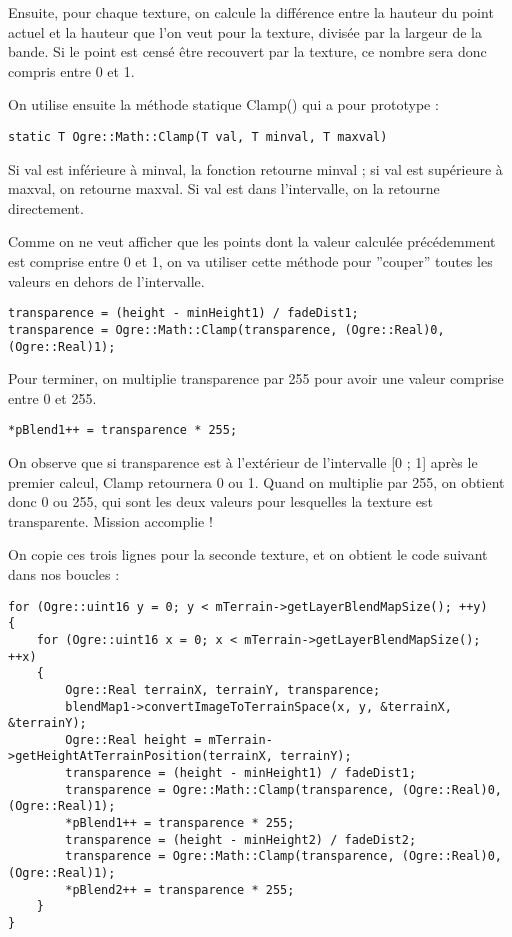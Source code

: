 \documentclass[10pt,a4paper]{report}
\begin{document}
Ensuite, pour chaque texture, on calcule la diff\'erence entre la hauteur du point actuel et la hauteur que l'on veut pour la texture, divis\'ee par la largeur de la bande. Si le point est cens\'e \^etre recouvert par la texture, ce nombre sera donc compris entre 0 et 1.

On utilise ensuite la m\'ethode statique Clamp() qui a pour prototype :

\begin{lstlisting}[caption={Utilisation de la m\'ethode statique Clamp()}]
static T Ogre::Math::Clamp(T val, T minval, T maxval)
\end{lstlisting}

Si val est inf\'erieure \`a minval, la fonction retourne minval ; si val est sup\'erieure \`a maxval, on retourne maxval. Si val est dans l'intervalle, on la retourne directement.

Comme on ne veut afficher que les points dont la valeur calcul\'ee pr\'ec\'edemment est comprise entre 0 et 1, on va utiliser cette m\'ethode pour ''couper'' toutes les valeurs en dehors de l'intervalle.

\begin{lstlisting}[caption={}]
transparence = (height - minHeight1) / fadeDist1;
transparence = Ogre::Math::Clamp(transparence, (Ogre::Real)0, (Ogre::Real)1);
\end{lstlisting}

Pour terminer, on multiplie transparence par 255 pour avoir une valeur comprise entre 0 et 255.

\begin{lstlisting}[caption={}]
*pBlend1++ = transparence * 255;
\end{lstlisting}

On observe que si transparence est \`a l'ext\'erieur de l'intervalle [0 ; 1] apr\`es le premier calcul, Clamp retournera 0 ou 1. Quand on multiplie par 255, on obtient donc 0 ou 255, qui sont les deux valeurs pour lesquelles la texture est transparente. Mission accomplie !

On copie ces trois lignes pour la seconde texture, et on obtient le code suivant dans nos boucles :

\begin{lstlisting}[caption={}]
for (Ogre::uint16 y = 0; y < mTerrain->getLayerBlendMapSize(); ++y)
{
    for (Ogre::uint16 x = 0; x < mTerrain->getLayerBlendMapSize(); ++x)
    {
        Ogre::Real terrainX, terrainY, transparence;
        blendMap1->convertImageToTerrainSpace(x, y, &terrainX, &terrainY);
        Ogre::Real height = mTerrain->getHeightAtTerrainPosition(terrainX, terrainY);
        transparence = (height - minHeight1) / fadeDist1;
        transparence = Ogre::Math::Clamp(transparence, (Ogre::Real)0, (Ogre::Real)1);
        *pBlend1++ = transparence * 255;
        transparence = (height - minHeight2) / fadeDist2;
        transparence = Ogre::Math::Clamp(transparence, (Ogre::Real)0, (Ogre::Real)1);
        *pBlend2++ = transparence * 255;
    }
}
\end{lstlisting}
\end{document}
